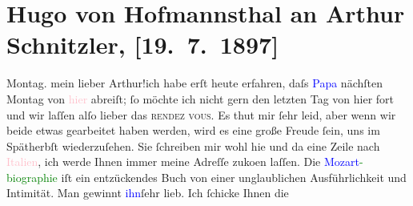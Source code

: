 

               \section[Hugo von Hofmannsthal an Arthur Schnitzler, {[}19. 7. 1897{]}]{ Hugo von Hofmannsthal an Arthur Schnitzler, {[}19. 7. 1897{]}}\nopagebreak{}\rehead{ }\normalsize\beginnumbering{} \toendnotes[C]{\smallbreak\pagebreak[2]} 
\toendnotes[C]{\smallbreak}\pstart
           \raggedleft{}{\pb}Montag.\pend
           \pstart
           mein lieber Arthur!ich habe erſt heute erfahren, daſs \textcolor{blue}{Papa}{} nächſten
                        Montag von \textcolor{pink}{hier}{} abreiſt; ſo möchte ich nicht gern den letzten Tag von hier fort
                    und wir laſſen alſo lieber das \textsc{rendez vous}. Es thut
                    mir ſehr leid, aber wenn wir beide etwas gearbeitet haben werden, wird es eine
                    große Freude ſein, uns im Spätherbſt wieder{\pb}zuſehen. Sie ſchreiben mir
                    wohl hie und da eine Zeile nach \textcolor{pink}{Italien}{}\ledrightnote{\textcolor{pink}{Italien}}, ich
                    werde Ihnen immer meine Adreſſe zuko{\geminationm}en laſſen.\pend
           \pstart
           Die \textcolor{green}{\textcolor{blue}{Mozart}{}\ledrightnote{\textcolor{blue}{Wolfgang Amadeus Mozart}}-biographie}{} iſt ein entzückendes Buch von einer unglaublichen Ausführlichkeit
                    und Intimität. Man gewinnt \textcolor{blue}{ihn}{}ſehr lieb. Ich ſchicke Ihnen die
